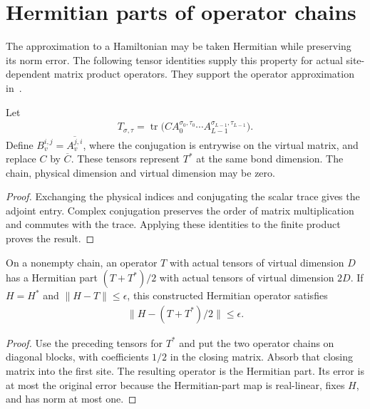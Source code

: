 \section{Hermitian parts of operator chains}
\label{sec:hermitian_operator_chains}

The approximation to a Hamiltonian may be taken Hermitian while preserving
its norm error. The following tensor identities supply this property for
actual site-dependent matrix product operators. They support the operator
approximation in~\cite[lines 1262--1268 and 1412--1420]{Arad2016RigorousRG}.

\begin{lemma}
    \label{lem:trace_chain_adjoint}
    \leanok
    Let
    \begin{align}
        T_{\sigma,\tau}
        =\operatorname{tr}\bigl(CA_0^{\sigma_0,\tau_0}
        \cdots A_{L-1}^{\sigma_{L-1},\tau_{L-1}}\bigr).
    \end{align}
    Define $B_v^{i,j}=\overline{A_v^{j,i}}$, where the conjugation is
    entrywise on the virtual matrix, and replace $C$ by $\overline C$.
    These tensors represent $T^*$ at the same bond dimension.
    The chain, physical dimension and virtual dimension may be zero.
\end{lemma}
\begin{proof}\leanok
    Exchanging the physical indices and conjugating the scalar trace gives
    the adjoint entry. Complex conjugation preserves the order of matrix
    multiplication and commutes with the trace. Applying these identities
    to the finite product proves the result.
\end{proof}

\begin{lemma}
    \label{lem:hermitian_trace_chain_approximation}
    \leanok
    On a nonempty chain, an operator $T$ with actual tensors of virtual
    dimension $D$ has a Hermitian part $(T+T^*)/2$ with actual tensors of
    virtual dimension $2D$. If $H=H^*$ and $\|H-T\|\leq\epsilon$, this
    constructed Hermitian operator satisfies
    \begin{align}
        \|H-(T+T^*)/2\|\leq\epsilon.
    \end{align}
\end{lemma}
\begin{proof}\leanok
    Use the preceding tensors for $T^*$ and put the two operator chains
    on diagonal blocks, with coefficients $1/2$ in the closing matrix.
    Absorb that closing matrix into the first site. The resulting operator
    is the Hermitian part. Its error is at most the original error because
    the Hermitian-part map is real-linear, fixes $H$, and has norm at most one.
\end{proof}

